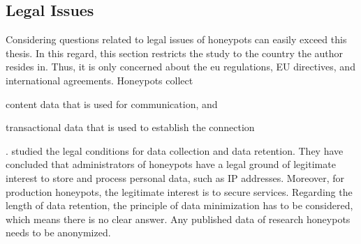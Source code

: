 \subsection{Legal Issues}

Considering questions related to legal issues of honeypots can easily exceed this thesis.
In this regard, this section restricts the study to the country the author resides in.
Thus, it is only concerned about the \ac{eu} regulations, EU directives, and international agreements.
Honeypots collect
\begin{enumerate*}[label=(\roman*)]
    \item content data that is used for communication, and
    \item transactional data that is used to establish the connection
\end{enumerate*}.
\citet{sokol2017} studied the legal conditions for data collection and data retention.
They have concluded that administrators of honeypots have a legal ground of legitimate interest to store and process personal data, such as IP addresses.
Moreover, for production honeypots, the legitimate interest is to secure services.
Regarding the length of data retention, the principle of data minimization has to be considered, which means there is no clear answer.
Any published data of research honeypots needs to be anonymized.
